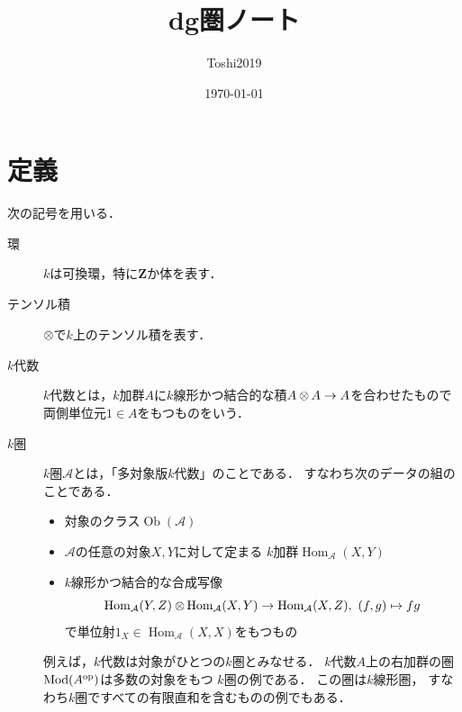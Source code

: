 \documentclass[leqno, 10pt, a4paper, dvipdfmx]{jsarticle}
\title{dg圏ノート}
\author{Toshi2019}
\date{\today}
\theoremstyle{definition}
\newcommand{\zz}{\mathbf{Z}}
\newcommand{\Mod}{\mathop{\mathrm{Mod}}\nolimits}
\newcommand{\cat}[1][]{\mathcal{#1}}
\newcommand{\Hom}{\mathop{\mathrm{Hom}}\nolimits} %
\newcommand{\op}{{\rm op}} %
\numberwithin{equation}{section}
\newcommand{\Ob}{\mathop{\textrm{Ob}}\nolimits}
\newcommand{\tens}[1][]{\mathbin{\otimes_{\raise1.5ex\hbox to-.1em{}{#1}}}}
\theoremstyle{mystyle}
\begin{document}
\maketitle
\tableofcontents






\section{定義}
次の記号を用いる．
\begin{description}
    \item[環] \(k\)は可換環，特に\(\zz\)か体を表す．
    \item[テンソル積] \(\tens[]\)で\(k\)上のテンソル積を表す．
    \item[\(k\)代数] \(k\)代数とは，\(k\)加群\(A\)に\(k\)線形かつ結合的な積\(A\tens[]A\to A\)を合わせたもので両側単位元\(1\in A\)をもつものをいう．
    \item[\(k\)圏] \(k\)圏\(\cat[A]\)とは，「多対象版\(k\)代数」のことである．
    すなわち次のデータの組のことである．\begin{itemize}
        \item 対象のクラス\(\Ob(\cat[A])\)
        \item \(\cat[A]\)の任意の対象\(X,Y\)に対して定まる
        \(k\)加群\(\Hom_{\cat[A]}(X,Y)\)
        \item \(k\)線形かつ結合的な合成写像\[
            \Hom_{\cat[A]}(Y,Z)\tens[]\Hom_{\cat[A]}(X,Y)
            \to\Hom_{\cat[A]}(X,Z),
            \ (f,g)\mapsto fg
        \]で単位射\(1_X\in \Hom_{\cat[A]}(X,X)\)をもつもの
    \end{itemize}
    例えば，\(k\)代数は対象がひとつの\(k\)圏とみなせる．
    \(k\)代数\(A\)上の右加群の圏\(\Mod(A^{\op})\)は多数の対象をもつ
    \(k\)圏の例である．
    この圏は\(k\)線形圏，
    すなわち\(k\)圏ですべての有限直和を含むものの例でもある．
\end{description}
\end{document}
